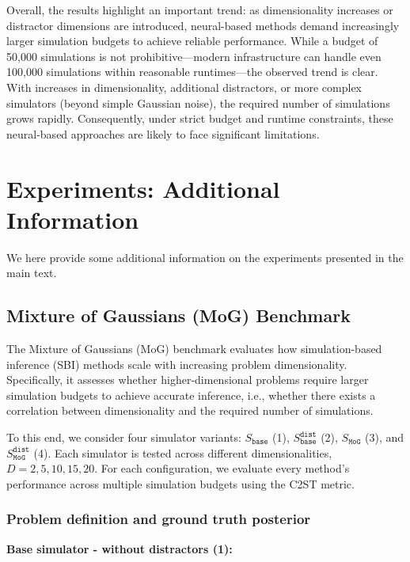 Overall, the results highlight an important trend: as dimensionality increases or distractor dimensions are introduced, neural-based methods demand increasingly larger simulation budgets to achieve reliable performance. While a budget of 50,000 simulations is not prohibitive—modern infrastructure can handle even 100,000 simulations within reasonable runtimes—the observed trend is clear. With increases in dimensionality, additional distractors, or more complex simulators (beyond simple Gaussian noise), the required number of simulations grows rapidly. Consequently, under strict budget and runtime constraints, these neural-based approaches are likely to face significant limitations.

\clearpage
\section{Experiments: Additional Information}
\label{app-sec:experiments}

We here provide some additional information on the experiments presented in the main text.

\subsection{Mixture of Gaussians (MoG) Benchmark}

The Mixture of Gaussians (MoG) benchmark evaluates how simulation-based inference (SBI) methods scale with increasing problem dimensionality.
Specifically, it assesses whether higher-dimensional problems require larger simulation budgets to achieve accurate inference, i.e., whether there exists a correlation between dimensionality and the required number of simulations.

To this end, we consider four simulator variants:
$S_{\texttt{base}}$ (1), $S_{\texttt{base}}^{\texttt{dist}}$ (2), $S_{\texttt{MoG}}$ (3), and $S_{\texttt{MoG}}^{\texttt{dist}}$ (4).
Each simulator is tested across different dimensionalities, $D = {2, 5, 10, 15, 20}$.
For each configuration, we evaluate every method’s performance across multiple simulation budgets using the C2ST metric.

\subsubsection{Problem definition and ground truth posterior}

\textbf{Base simulator - without distractors (1):}

